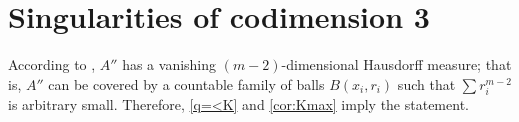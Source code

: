 \section{Singularities of codimension 3}\label{sec:codmi=3}


According to \cite[10.6]{BGP}, $A''$ has a vanishing $(m-2)$-dimensional Hausdorff measure;
that is, $A''$ can be covered by a countable family of balls $B(x_i,r_i)$ such that $\sum r_i^{m-2}$ is arbitrary small.
Therefore, \ref{q=<K} and \ref{cor:Kmax} imply the statement.
\qeds
